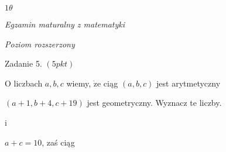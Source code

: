 \documentclass[a4paper,12pt]{article}
\begin{document}
$ 1\theta$

{\it Egzamin maturalny z matematyki}

{\it Poziom rozszerzony}

Zadanie 5. $(5pkt)$

$\mathrm{O}$ liczbach $a, b, c$ wiemy, $\dot{\mathrm{z}}\mathrm{e}$ ciąg $(a,b,c)$ jest arytmetyczny

$(a+1,b+4,c+19)$ jest geometryczny. Wyznacz te liczby.

i

$a+c=10$, zaś ciąg
\end{document}
